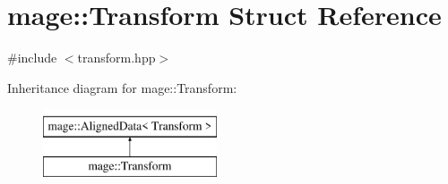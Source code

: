 \hypertarget{structmage_1_1_transform}{}\section{mage\+:\+:Transform Struct Reference}
\label{structmage_1_1_transform}


{\ttfamily \#include $<$transform.\+hpp$>$}

Inheritance diagram for mage\+:\+:Transform\+:\begin{figure}[H]
\begin{center}
\leavevmode
\includegraphics[height=2.000000cm]{structmage_1_1_transform}
\end{center}
\end{figure}
